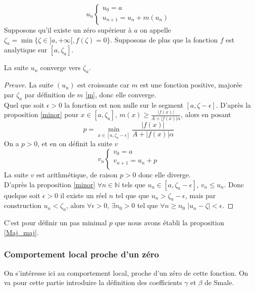 \documentclass[a4paper,10pt]{article}
\begin{document}
	\begin{equation}
	u_n
	\left\lbrace
	\begin{array}{l}
	u_0=a\\
	u_{n+1}=u_n+m(u_n)
	\end{array}\right.
	\end{equation}
	Supposons qu'il existe un zéro supérieur à $a$ on appelle $\zeta_a=\min\{\zeta \in ]a,+\infty[, f(\zeta)=0\}$. Supposons de plus que la fonction $f$ est analytique sur $[a, \zeta_a]$.
	\begin{proposition}
		La suite $u_n$ converge vers $\zeta_a$.
	\end{proposition}
	\begin{proof}[Preuve]
		La suite $(u_n)$ est croissante car $m$ est une fonction positive, majorée par $\zeta_a$ par définition de $m$ \eqref{m}, donc elle converge.\\
		Quel que soit $\epsilon>0$ la fonction est non nulle sur le segment $[a, \zeta-\epsilon]$. D'après la proposition \ref{minor} pour $x \in [a,\zeta_a]$, $m(x)\geq \frac{|f(x)|}{A+|f(x)|\alpha}$,
		alors en posant 
		\[p=\min_{x \in [a,\zeta_a-\epsilon]}\frac{|f(x)|}{A+|f(x)|\alpha}\]
		On a $p>0$, et en on définit la suite $v$ 
		\begin{equation}
		v_n
		\left\lbrace
		\begin{array}{l}
		v_0=a\\
		v_{n+1}=u_n+p\\
		\end{array}\right.
		\end{equation}
		La suite $v$ est arithmétique, de raison $p>0$ donc elle diverge. \\
		D'après la proposition \ref{minor} $ \forall n \in \mathbb{N}$ tels que $u_n \in [a,\zeta_a-\epsilon]$, $v_n\leq u_n$. Donc quelque soit $\epsilon>0$ il existe un réel $n$ tel que que $u_n> \zeta_a-\epsilon$, mais par construction  $u_n<\zeta_a$, alors $\forall \epsilon>0$,  $\exists n_0>0$ tel que $\forall n\geq n_0$  $|u_n-\zeta|<\epsilon$.
	\end{proof}
	C'est pour définir un pas minimal $p$ que nous avons établi la proposition \ref{Maj_maj}.
	
	\subsubsection{Comportement local proche d'un zéro}
	On s'intéresse ici au comportement local, proche d'un zéro de cette fonction.
	On va pour cette partie introduire la définition des coefficients $\gamma$ et $\beta$ de Smale.
	
\end{document}
